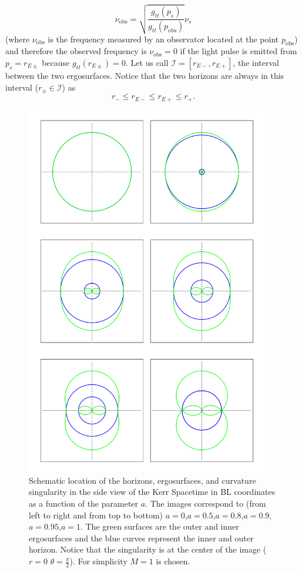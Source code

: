 \begin{equation}
 \nu_{\text{obs}}=\sqrt{\frac{g_{tt}(p_s)}{g_{tt}(p_\text{obs})}}  \nu_s
\end{equation}
(where $ \nu_{\text{obs}}$ is the frequency measured by an observator located at the point $p_\text{obs}$) and therefore the observed frequency is $ \nu_{\text{obs}}=0$ if the light pulse is emitted from $p_s=r_{E \pm}$ because $g_{tt}(r_{E \pm})=0$. Let us call $\mathcal{I}=[r_{E-},r_{E+}]$, the interval between the two ergosurfaces. Notice that the two horizons are always in this interval ($r_\pm \in \mathcal{I}$) as
\begin{equation}
 r_- \leq r_{E-} \leq r_{E+} \leq r_+.
\end{equation}
  \begin{figure}[htp!]  
\begin{center}
 \centerline{\includegraphics[width=0.95\textwidth]{img/Chapter0/erg.png}}
 \end{center}
 \vspace{-1.5cm}
 \caption{Schematic location of the horizons, ergosurfaces, and curvature singularity in the side view of the Kerr Spacetime in \gls{BL} coordinates as a function of the parameter $a$. The images correspond to (from left to right and from top to bottom) $a=0$,$a=0.5$,$a=0.8$,$a=0.9$,$a=0.95$,$a=1$. The green surfaces are the outer and inner ergosurfaces and the blue curves represent the inner and outer horizon. Notice that the singularity is at the center of the image ($r=0$ $\theta=\frac{\pi}{2}$). For simplicity $M=1$ is chosen.}
 \label{fig:ergo1}
\end{figure} 
